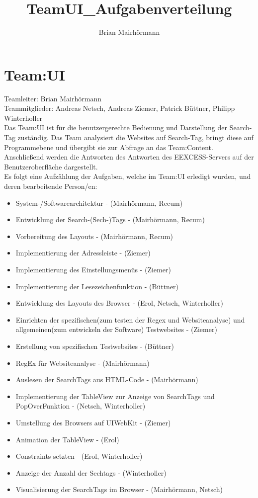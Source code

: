 \documentclass[a4paper,12pt]{article}
\title{TeamUI_Aufgabenverteilung}
\author{Brian Mairhörmann}
\begin{document}
\section{Team:UI}

Teamleiter: Brian Mairhörmann\\
Teammitglieder: Andreas Netsch, Andreas Ziemer, Patrick Büttner, Philipp Winterholler\\
Das Team:UI ist für die benutzergerechte Bedienung und Darstellung der Search-Tag zuständig.
Das Team analysiert die Websites auf Search-Tag, bringt diese auf Programmebene und übergibt sie
zur Abfrage an das Team:Content. Anschließend werden die Antworten des Antworten des EEXCESS-Servers
auf der Benutzeroberfläche dargestellt.\\
Es folgt eine Aufzählung der Aufgaben, welche im Team:UI erledigt wurden, und deren bearbeitende Person/en:\\
\begin{itemize}
	\item System-/Softwarearchitektur - (Mairhörmann, Recum)
	\item Entwicklung der Search-(Sech-)Tags - (Mairhörmann, Recum)
	\item Vorbereitung des Layouts - (Mairhörmann, Recum)
	\item Implementierung der Adressleiste - (Ziemer)
	\item Implementierung des Einstellungsmenüs - (Ziemer)
	\item Implementierung der Lesezeichenfunktion - (Büttner)
	\item Entwicklung des Layouts des Browser - (Erol, Netsch, Winterholler)
	\item Einrichten der spezifischen(zum testen der Regex und Websiteanalyse) und allgemeinen(zum entwickeln der Software) Testwebsites - (Ziemer)
	\item Erstellung von spezifischen Testwebsites - (Büttner)
	\item RegEx für Websiteanalyse - (Mairhörmann)
	\item Auslesen der SearchTags aus HTML-Code - (Mairhörmann)
	\item Implementierung der TableView zur Anzeige von SearchTags und PopOverFunktion - (Netsch, Winterholler)
	\item Umstellung des Browsers auf UIWebKit - (Ziemer)
	\item Animation der TableView - (Erol)
	\item Constraints setzten - (Erol, Winterholler)
	\item Anzeige der Anzahl der Sechtags - (Winterholler)
	\item Visualisierung der SearchTags im Browser - (Mairhörmann, Netsch)
\end{itemize}
\end{document}
